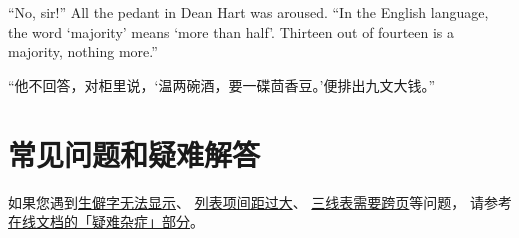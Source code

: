 ``No, sir!'' All the pedant in Dean Hart was aroused. ``In the English language, the word `majority' means `more than half'. Thirteen out of fourteen is a majority, nothing more.''

“他不回答，对柜里说，‘温两碗酒，要一碟茴香豆。’便排出九文大钱。”



\section{常见问题和疑难解答}

如果您遇到\href{https://bithesis.bitnp.net/faq/char-missing.html}{生僻字无法显示}、
\href{https://bithesis.bitnp.net/faq/enumitem-nosep.html}{列表项间距过大}、
\href{https://bithesis.bitnp.net/faq/longtable.html}{三线表需要跨页}等问题，
请参考\textcolor{magenta}{\href{https://bithesis.bitnp.net/faq/}{在线文档的「疑难杂症」部分}}。
